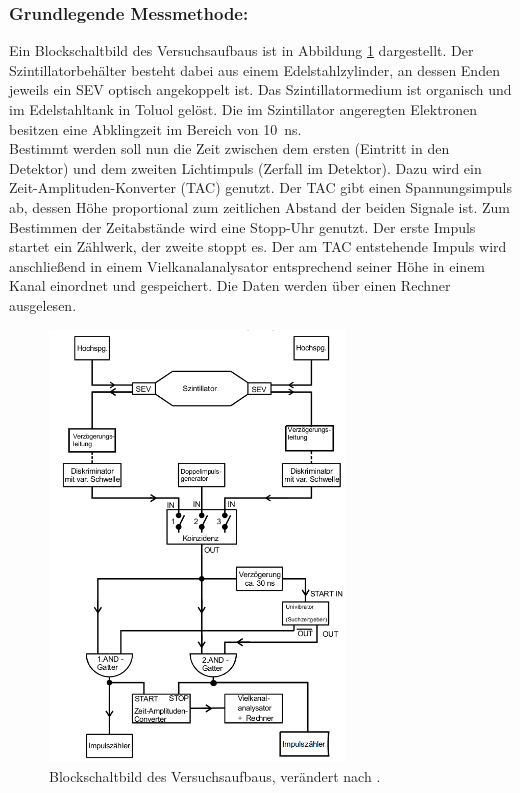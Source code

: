   \subsubsection{Grundlegende Messmethode:}
  	Ein Blockschaltbild des Versuchsaufbaus ist in Abbildung \ref{fig:aufbau} dargestellt.
  	Der Szintillatorbehälter besteht dabei aus einem Edelstahlzylinder, an dessen
  	Enden jeweils ein SEV optisch angekoppelt ist. Das Szintillatormedium ist organisch
  	und im Edelstahltank in Toluol gelöst. Die im Szintillator angeregten Elektronen besitzen eine
  	Abklingzeit im Bereich von \SI{10}{\nano\second}.\\
  	Bestimmt werden soll nun die Zeit zwischen dem ersten (Eintritt in den
  	Detektor) und dem zweiten Lichtimpuls (Zerfall im Detektor). Dazu wird ein
  	Zeit-Amplituden-Konverter (TAC) genutzt. Der TAC gibt einen Spannungsimpuls ab,
  	dessen Höhe proportional zum zeitlichen Abstand der
  	beiden Signale ist. Zum Bestimmen der Zeitabstände wird eine Stopp-Uhr genutzt.
    Der erste Impuls startet ein Zählwerk, der zweite stoppt es.
    Der am TAC entstehende Impuls wird anschließend in einem Vielkanalanalysator
  	entsprechend seiner Höhe in einem Kanal einordnet und gespeichert.
  	Die Daten werden über einen Rechner ausgelesen.
  	\begin{figure}[p]
    	\centering
    	\includegraphics[width=0.7\textwidth]{Bilder/AufbauB.png}
    	\caption{Blockschaltbild des Versuchsaufbaus, verändert nach \cite{anleitung}.}
    	\label{fig:aufbau}
  	\end{figure}
